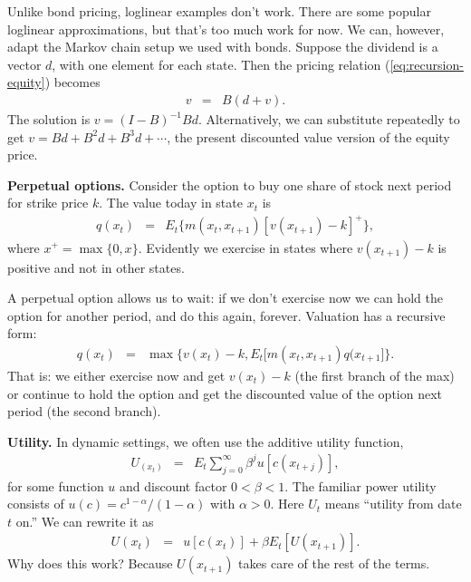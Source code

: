 \documentclass[11pt]{article}
\begin{document}
Unlike bond pricing, loglinear examples don't work.
There are some popular loglinear approximations, but that's too much work for now.
We can, however, adapt the Markov chain setup we used with bonds.  
Suppose the dividend is a vector $d$, with one element for each state.  
Then the pricing relation (\ref{eq:recursion-equity}) becomes
\begin{eqnarray*}
    v &=& B (d+v) .
\end{eqnarray*}
The solution is $ v = (I-B)^{-1} B d$.  
Alternatively, we can substitute repeatedly to get 
$ v = B d + B^2 d + B^3 d + \cdots $, 
the present discounted value version of the equity price.


{\bf Perpetual options.\/}
Consider the option to buy one share of stock next period for strike price $k$.
The value today in state $x_t$ is
\begin{eqnarray*}
    q(x_t) &=& E_t \big\{ m(x_t,x_{t+1}) [v(x_{t+1}) - k]^+ \big\} ,
\end{eqnarray*}
where $x^+ = \max \{0, x \} $.
Evidently we exercise in states where $ v(x_{t+1}) - k$ is positive
and not in other states.

A perpetual option allows us to wait:  if we don't exercise now
we can hold the option for another period, and do this again, forever.
Valuation has a recursive form:  
\begin{eqnarray*}
    q(x_t) &=& \max \big\{ v(x_{t}) - k, E_t \big[ m(x_t,x_{t+1}) q(x_{t+1}\big] \big\} .
\end{eqnarray*}
That is:  we either exercise now and get $v(x_t)-k$ (the first branch
of the max) or continue to hold the option and get the discounted value of the option
next period (the second branch).



{\bf Utility.\/} 
In dynamic settings, we often use the additive utility function, 
\begin{eqnarray*}
    U_(x_t) &=& E_t \sum_{j=0}^\infty \beta^j u[c(x_{t+j})] ,
\end{eqnarray*}
for some function $u$ and discount factor $ 0 < \beta < 1 $.
The familiar power utility consists of $u(c) = c^{1-\alpha}/(1-\alpha)$ with $\alpha > 0$.
Here $U_t$ means ``utility from date $t$ on.''
We can rewrite it as 
\begin{eqnarray*}
    U(x_t) &=&  u[c(x_{t})] + \beta E_t [U(x_{t+1})]  .
\end{eqnarray*}
Why does this work?  Because $U(x_{t+1})$ takes care of the rest of the terms.
\end{document}

